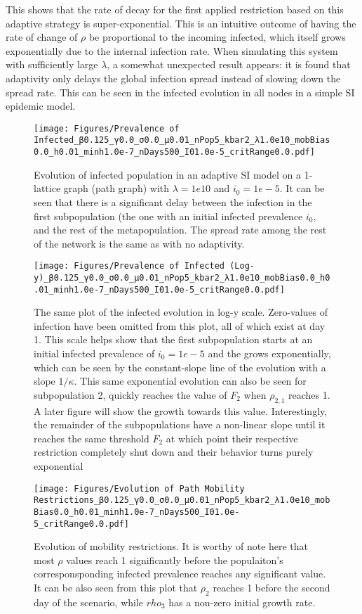 \documentclass{article}
\begin{document}
This shows that the rate of decay for the first applied restriction based on this adaptive strategy is super-exponential. This is an intuitive outcome of having the rate of change of $\rho$ be proportional to the incoming infected, which itself grows exponentially due to the internal infection rate. When simulating this system with sufficiently large $\lambda$, a somewhat unexpected result appears: it is found that adaptivity only delays the global infection spread instead of slowing down the spread rate. This can be seen in the infected evolution in all nodes in a simple SI epidemic model.

\begin{figure}[!ht]
    \centering
    \texttt{[image: Figures/Prevalence of Infected\_β0.125\_γ0.0\_σ0.0\_μ0.01\_nPop5\_kbar2\_λ1.0e10\_mobBias0.0\_h0.01\_minh1.0e-7\_nDays500\_I01.0e-5\_critRange0.0.pdf]}
    \caption{\small Evolution of infected population in an adaptive SI model on a 1-lattice graph 
    (path graph) with $\lambda = 1e10$ and $i_0 = 1e-5$. It can be seen that there is a significant 
    delay between the infection in the first subpopulation (the one with an initial infected prevalence $i_0$, and the rest of the metapopulation. The spread rate among the rest of the network is the same as with no adaptivity.}
\end{figure}

\begin{figure}[!ht]
    \centering
    \texttt{[image: Figures/Prevalence of Infected (Log-y)\_β0.125\_γ0.0\_σ0.0\_μ0.01\_nPop5\_kbar2\_λ1.0e10\_mobBias0.0\_h0.01\_minh1.0e-7\_nDays500\_I01.0e-5\_critRange0.0.pdf]}
    \caption{\small The same plot of the infected evolution in log-y scale. 
    Zero-values of infection have been omitted from this plot, all of which exist at day 1. 
    This scale helps show that the first subpopulation starts at an initial infected prevalence of 
    $i_0=1e-5$ and the grows exponentially, which can be seen by the constant-slope line of the evolution with a slope $1/\kappa$. This same exponential evolution can also be seen for subpopulation 2, quickly reaches the value of $F_2$ when $\rho_{2,1}$ reaches 1. A later figure will show the growth towards this value. Interestingly, the remainder of the subpopulations have a non-linear slope until it reaches the same threshold $F_2$ at which point their respective restriction completely shut down and their behavior turns purely exponential}
\end{figure}

\begin{figure}[!ht]
    \centering
    \texttt{[image: Figures/Evolution of Path Mobility Restrictions\_β0.125\_γ0.0\_σ0.0\_μ0.01\_nPop5\_kbar2\_λ1.0e10\_mobBias0.0\_h0.01\_minh1.0e-7\_nDays500\_I01.0e-5\_critRange0.0.pdf]}
    \caption{\small Evolution of mobility restrictions. It is worthy of note here that most $\rho$ values reach 1 significantly before the populaiton's corresponsponding infected prevalence reaches any significant value. It can be also seen from this plot that $\rho_2$ reaches 1 before the second day of the scenario, while $rho_3$ has a non-zero initial growth rate.}
\end{figure}
\end{document}
